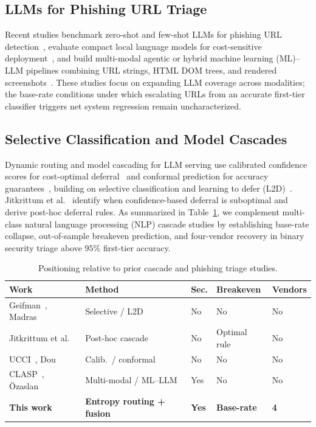 \documentclass[conference,a4paper]{IEEEtran}
\begin{document}
\subsection{LLMs for Phishing URL Triage}
Recent studies benchmark zero-shot and few-shot LLMs for phishing URL
detection~\cite{llmzeroshot2026,mdpi2025llm}, evaluate compact local language models
for cost-sensitive deployment~\cite{slm2025}, and build multi-modal agentic or hybrid
machine learning (ML)--LLM pipelines combining URL strings, HTML DOM trees, and
rendered screenshots~\cite{clasp2025,ozaslan2026}. These studies focus on expanding
LLM coverage across modalities; the base-rate conditions under which escalating URLs
from an accurate first-tier classifier triggers net system regression remain
uncharacterized.

\subsection{Selective Classification and Model Cascades}
Dynamic routing and model cascading for LLM serving use calibrated confidence scores
for cost-optimal deferral~\cite{routingsurvey2026,ucci2026} and conformal prediction
for accuracy guarantees~\cite{conformalcascade2026}, building on selective
classification and learning to defer (L2D)~\cite{geifman2017,madras2018}. Jitkrittum
et al.~\cite{jitkrittum2023} identify when confidence-based deferral is suboptimal
and derive post-hoc deferral rules. As summarized in Table~\ref{tab:relwork}, we
complement multi-class natural language processing (NLP) cascade studies by
establishing base-rate collapse,
out-of-sample breakeven prediction, and four-vendor recovery in binary security
triage above $95\%$ first-tier accuracy.

\begin{table}[!t]
\caption{Positioning relative to prior cascade and phishing triage studies.}
\label{tab:relwork}
\centering
\scriptsize
\setlength{\tabcolsep}{1.8pt}
\begin{tabular}{lllll}
\toprule
Work & Method & Sec. & Breakeven & Vendors \\
\midrule
Geifman~\cite{geifman2017}, Madras~\cite{madras2018} & Selective / L2D & No & No & No \\
Jitkrittum et al.~\cite{jitkrittum2023} & Post-hoc cascade & No & Optimal rule & No \\
UCCI~\cite{ucci2026}, Dou~\cite{conformalcascade2026} & Calib.\ / conformal & No & No & No \\
CLASP~\cite{clasp2025}, \"{O}zaslan~\cite{ozaslan2026} & Multi-modal / ML--LLM & Yes & No & No \\
\textbf{This work} & \textbf{Entropy routing + fusion} & \textbf{Yes} & \textbf{Base-rate} & \textbf{4} \\
\bottomrule
\end{tabular}
\end{table}
\end{document}
